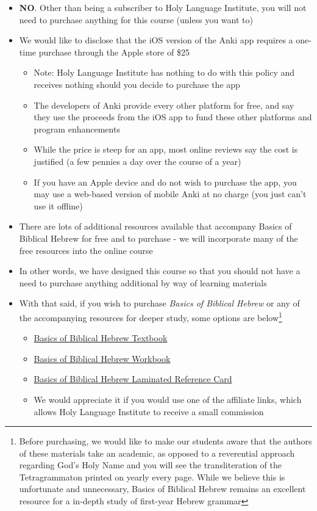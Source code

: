 \documentclass[
]{turabian-researchpaper}
\providecommand{\tightlist}{%
  \setlength{\itemsep}{0pt}\setlength{\parskip}{0pt}}
\begin{document}
\begin{itemize}
\tightlist
\item
  \textbf{NO}. Other than being a subscriber to Holy Language Institute, you will not need to purchase anything for this course (unless you want to)
\item
  We would like to disclose that the iOS version of the Anki app requires a one-time purchase through the Apple store of \$25

  \begin{itemize}
  \tightlist
  \item
    Note: Holy Language Institute has nothing to do with this policy and receives nothing should you decide to purchase the app
  \item
    The developers of Anki provide every other platform for free, and say they use the proceeds from the iOS app to fund these other platforms and program enhancements
  \item
    While the price is steep for an app, most online reviews say the cost is justified (a few pennies a day over the course of a year)
  \item
    If you have an Apple device and do not wish to purchase the app, you may use a web-based version of mobile Anki at no charge (you just can't use it offline)
  \end{itemize}
\item
  There are lots of additional resources available that accompany Basics of Biblical Hebrew for free and to purchase - we will incorporate many of the free resources into the online course
\item
  In other words, we have designed this course so that you should not have a need to purchase anything additional by way of learning materials
\item
  With that said, if you wish to purchase \emph{Basics of Biblical Hebrew} or any of the accompanying resources for deeper study, some options are below\footnote{Before purchasing, we would like to make our students aware that the authors of these materials take an academic, as opposed to a reverential approach regarding God's Holy Name and you will see the transliteration of the Tetragrammaton printed on yearly every page. While we believe this is unfortunate and unnecessary, Basics of Biblical Hebrew remains an excellent resource for a in-depth study of first-year Hebrew grammar}

  \begin{itemize}
  \tightlist
  \item
    \href{https://www.amazon.com/gp/product/031053349X/\&tag=holylanginst-20}{Basics of Biblical Hebrew Textbook}
  \item
    \href{https://www.amazon.com/gp/product/0310533554/\&tag=holylanginst-20}{Basics of Biblical Hebrew Workbook}
  \item
    \href{https://www.amazon.com/gp/product/031026295X/\&tag=holylanginst-20}{Basics of Biblical Hebrew Laminated Reference Card}
  \item
    We would appreciate it if you would use one of the affiliate links, which allows Holy Language Institute to receive a small commission
  \end{itemize}
\end{itemize}
\end{document}

